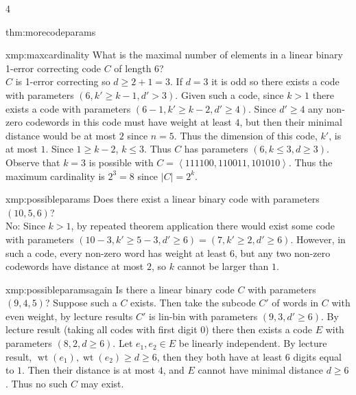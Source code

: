 \documentclass[landscape, 8pt]{extarticle}
\DeclareMathOperator{\wt}{wt}
\begin{document}
\begin{multicols*}{4}
\begin{thm}{thm:morecodeparams}{ }
		\end{thm}
		
		
		\begin{xmp}{xmp:maxcardinality}{ }
		What is the maximal number of elements in a linear binary 1-error correcting code $C$ of length $6$?\\
		$C$ is 1-error correcting so $d \ge 2+1 = 3$. If $d=3$ it is odd so there exists a code with parameters $(6, k' \ge k-1, d' > 3)$. Given such a code, since $k > 1$ there exists a code with parameters $(6-1, k' \ge k-2, d' \ge 4)$. Since $d' \ge 4$ any non-zero codewords in this code must have weight at least $4$, but then their minimal distance would be at most $2$ since $n=5$. Thus the dimension of this code, $k'$, is at most $1$. Since $1 \ge k-2$, $k \le 3$. Thus $C$ has parameters $(6, k \le 3, d \ge 3)$. Observe that $k=3$ is possible with $C = \left\langle 111100, 110011, 101010\right\rangle$. Thus the maximum cardinality is $2^3 = 8$ since $\left|C\right| = 2^k$.
		
		\end{xmp}
		
		
		\begin{xmp}{xmp:possibleparams}{ }
		Does there exist a linear binary code with parameters $(10, 5, 6)$?\\
		No: Since $k>1$, by repeated theorem application there would exist some code with parameters $(10-3, k' \ge 5-3, d' \ge 6) = (7, k' \ge 2, d' \ge 6)$. However, in such a code, every non-zero word has weight at least $6$, but any two non-zero codewords have distance at most $2$, so $k$ cannot be larger than $1$.
		
		\end{xmp}
		
		
		\begin{xmp}{xmp:possibleparamsagain}{ }
		Is there a linear binary code $C$ with parameters $(9, 4, 5)$?
		Suppose such a $C$ exists. Then take the subcode $C'$ of words in $C$ with even weight, by lecture results $C'$ is lin-bin with parameters $(9, 3, d' \ge 6)$. By lecture result (taking all codes with first digit $0$) there then exists a code $E$ with parameters $(8, 2, d \ge 6)$. Let $e_1, e_2\in E$ be linearly independent. By lecture result, $\wt(e_1), \wt(e_2) \ge d \ge 6$, then they both have at least $6$ digits equal to $1$. Then their distance is at most $4$, and $E$ cannot have minimal distance $d \ge 6$. Thus no such $C$ may exist. 
		

\end{xmp}
\end{multicols*}
\end{document}
